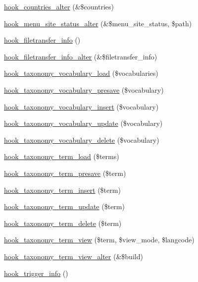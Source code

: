 \begin{DoxyCompactItemize}
\hyperlink{group__hooks_gaceba413e5b878b5f04668d1aa4fcb804}{hook\_\-countries\_\-alter} (\&\$countries)
\item 
\hyperlink{group__hooks_ga3096be11aad61c8b342ade94789f6137}{hook\_\-menu\_\-site\_\-status\_\-alter} (\&\$menu\_\-site\_\-status, \$path)
\item 
\hyperlink{group__hooks_gacecdedb61704444382417e6ec8da240d}{hook\_\-filetransfer\_\-info} ()
\item 
\hyperlink{group__hooks_ga96aeda9756a48de73dacbf8bf1745266}{hook\_\-filetransfer\_\-info\_\-alter} (\&\$filetransfer\_\-info)
\item 
\hyperlink{group__hooks_ga2426242aecd7bc83f3201d2e87093b5c}{hook\_\-taxonomy\_\-vocabulary\_\-load} (\$vocabularies)
\item 
\hyperlink{group__hooks_ga8ec7aaf710eacd639ce92443139089d0}{hook\_\-taxonomy\_\-vocabulary\_\-presave} (\$vocabulary)
\item 
\hyperlink{group__hooks_ga438bdb494fe8b75625b9451e94165065}{hook\_\-taxonomy\_\-vocabulary\_\-insert} (\$vocabulary)
\item 
\hyperlink{group__hooks_gaf7e614327d1d3826d208fd6528df4a70}{hook\_\-taxonomy\_\-vocabulary\_\-update} (\$vocabulary)
\item 
\hyperlink{group__hooks_ga76a12ce251cd46c0b33f73a190f77d8d}{hook\_\-taxonomy\_\-vocabulary\_\-delete} (\$vocabulary)
\item 
\hyperlink{group__hooks_ga043d5ebe3d15a7ff5a84e8016a96467f}{hook\_\-taxonomy\_\-term\_\-load} (\$terms)
\item 
\hyperlink{group__hooks_ga2dad7857b3613834314f694e183e1fdb}{hook\_\-taxonomy\_\-term\_\-presave} (\$term)
\item 
\hyperlink{group__hooks_gabab3537accc8ce17fe2cd0f73f4bb817}{hook\_\-taxonomy\_\-term\_\-insert} (\$term)
\item 
\hyperlink{group__hooks_ga5c2477516245f0b9d6b04b8a8d227592}{hook\_\-taxonomy\_\-term\_\-update} (\$term)
\item 
\hyperlink{group__hooks_gab55fa1f290f3d43ea59795123154cf32}{hook\_\-taxonomy\_\-term\_\-delete} (\$term)
\item 
\hyperlink{group__hooks_gaeb73cbcc621835fb8f1d9114b3234bd5}{hook\_\-taxonomy\_\-term\_\-view} (\$term, \$view\_\-mode, \$langcode)
\item 
\hyperlink{group__hooks_gad02862e477fbc925f70a7f91d2916820}{hook\_\-taxonomy\_\-term\_\-view\_\-alter} (\&\$build)
\item 
\hyperlink{group__hooks_ga6796483976be1fa22589582444c6fdbb}{hook\_\-trigger\_\-info} ()

\end{DoxyCompactItemize}
